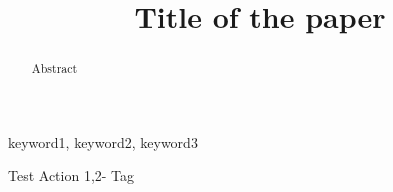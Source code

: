 \documentclass[conference]{IEEEtran}
\begin{document}
\title{Title of the paper
{\footnotesize}
}

\author{
}

\maketitle

\begin{abstract} 
Abstract 
\end{abstract}

\begin{IEEEkeywords}
keyword1, keyword2, keyword3
\end{IEEEkeywords}


Test Action 1,2- Tag


\clearpage
\end{document}
